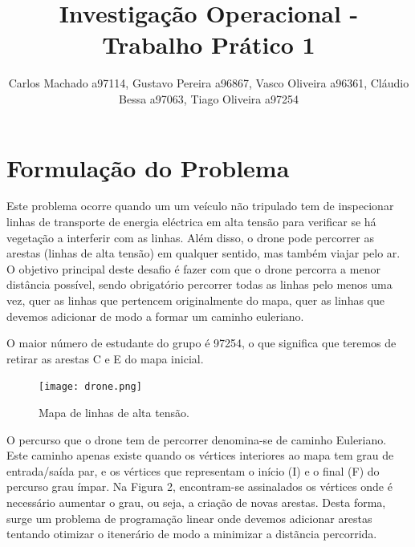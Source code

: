 \documentclass[runningheads]{llncs}
\begin{document}
%
    \title{Investigação Operacional - Trabalho Prático 1}
    \author{Carlos Machado a97114, Gustavo Pereira a96867,
        Vasco Oliveira a96361, Cláudio Bessa a97063, Tiago Oliveira a97254}





    \maketitle
    \newpage
    \section{Formulação do Problema}


    Este problema ocorre quando um um veículo não tripulado tem de inspecionar linhas de transporte de energia eléctrica em alta tensão para verificar se há vegetação a interferir com as linhas. Além disso, o drone pode percorrer as arestas (linhas de alta tensão) em qualquer sentido, mas também viajar pelo ar. O objetivo principal deste desafio é fazer com que o drone percorra a menor distância possível, sendo obrigatório percorrer todas as linhas pelo menos uma vez, quer as linhas que pertencem originalmente do mapa, quer as linhas que devemos adicionar de modo a formar um caminho euleriano.

    O maior número de estudante do grupo é 97254, o que significa que teremos de retirar as arestas C e E do mapa inicial.

    \begin{figure}[h]
        \centering
        \texttt{[image: drone.png]}
        \caption{Mapa de linhas de alta tensão.}
        \label{fig:data1}
    \end{figure}

    O percurso que o drone tem de percorrer denomina-se de caminho Euleriano. Este caminho apenas existe quando os vértices interiores ao mapa tem grau de entrada/saída par, e os vértices que representam o início (I) e o final (F) do percurso grau ímpar. Na Figura 2, encontram-se assinalados os vértices onde é necessário aumentar o grau, ou seja, a criação de novas arestas. Desta forma, surge um problema de programação linear onde devemos adicionar arestas tentando otimizar o itenerário de modo a minimizar a distãncia percorrida.
\end{document}
